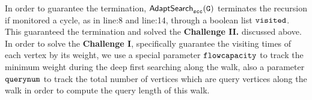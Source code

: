 In order to
guarantee the termination, 
$\mathtt{\mathsf{AdaptSearch}_{scc}(G)}$
terminates the recursion if monitored a cycle, as in line:8 and line:14, through a boolean list $\mathtt{visited}$.
This guaranteed the termination and solved the \textbf{Challenge II.} discussed above.
\\
In order to
solve the \textbf{Challenge I},
specifically guarantee the visiting times of each vertex by its weight, 
we use a special parameter $\mathtt{flowcapacity}$  to track the minimum weight during the 
deep first searching along the walk, 
also a parameter $\mathtt{querynum}$
to track the total number of vertices which are query vertices along the walk in order to compute the query length of this walk.
% 

